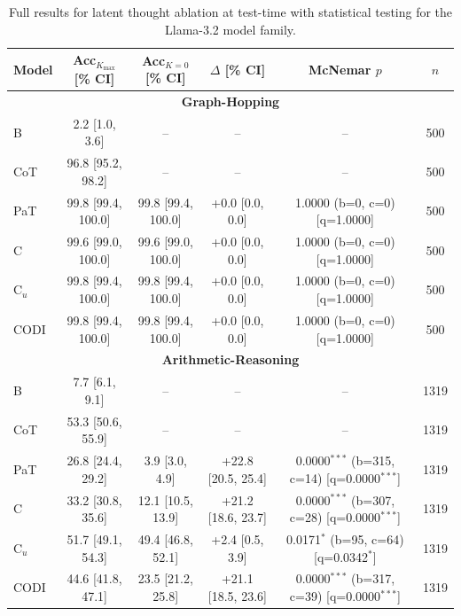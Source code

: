 \begin{table}[h!]
\centering
\small
\setlength{\tabcolsep}{4pt}
\begin{tabular}{l ccc cc}
\toprule
Model & Acc$_{K_{\max}}$ [\% CI] & Acc$_{K{=}0}$ [\% CI] & $\Delta$ [\% CI] & McNemar $p$ & $n$ \\
\midrule
\multicolumn{6}{c}{\textbf{Graph-Hopping}} \\
\midrule
B & 2.2 [1.0, 3.6] & -- & -- & -- & 500 \\
CoT & 96.8 [95.2, 98.2] & -- & -- & -- & 500 \\
PaT & 99.8 [99.4, 100.0] & 99.8 [99.4, 100.0] & +0.0 [0.0, 0.0] & 1.0000 (b=0, c=0) [q=1.0000] & 500 \\
C & 99.6 [99.0, 100.0] & 99.6 [99.0, 100.0] & +0.0 [0.0, 0.0] & 1.0000 (b=0, c=0) [q=1.0000] & 500 \\
C$_u$ & 99.8 [99.4, 100.0] & 99.8 [99.4, 100.0] & +0.0 [0.0, 0.0] & 1.0000 (b=0, c=0) [q=1.0000] & 500 \\
CODI & 99.8 [99.4, 100.0] & 99.8 [99.4, 100.0] & +0.0 [0.0, 0.0] & 1.0000 (b=0, c=0) [q=1.0000] & 500 \\
\midrule
\multicolumn{6}{c}{\textbf{Arithmetic-Reasoning}} \\
\midrule
B & 7.7 [6.1, 9.1] & -- & -- & -- & 1319 \\
CoT & 53.3 [50.6, 55.9] & -- & -- & -- & 1319 \\
PaT & 26.8 [24.4, 29.2] & 3.9 [3.0, 4.9] & +22.8 [20.5, 25.4] & 0.0000$^{***}$ (b=315, c=14) [q=0.0000$^{***}$] & 1319 \\
C & 33.2 [30.8, 35.6] & 12.1 [10.5, 13.9] & +21.2 [18.6, 23.7] & 0.0000$^{***}$ (b=307, c=28) [q=0.0000$^{***}$] & 1319 \\
C$_u$ & 51.7 [49.1, 54.3] & 49.4 [46.8, 52.1] & +2.4 [0.5, 3.9] & 0.0171$^{*}$ (b=95, c=64) [q=0.0342$^{*}$] & 1319 \\
CODI & 44.6 [41.8, 47.1] & 23.5 [21.2, 25.8] & +21.1 [18.5, 23.6] & 0.0000$^{***}$ (b=317, c=39) [q=0.0000$^{***}$] & 1319 \\
\bottomrule
\end{tabular}
\caption{Full results for latent thought ablation at test-time with statistical testing for the Llama-3.2 model family.}
\label{tab:ablation_stats_llama}
\end{table}
